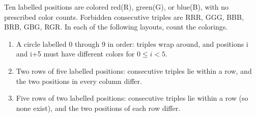 Ten labelled positions are colored red(R), green(G), or blue(B), with no prescribed color counts. Forbidden consecutive triples are RRR, GGG, BBB, BRB, GBG, RGR. In each of the following layouts, count the colorings.\begin{enumerate}\item A circle labelled 0 through 9 in order: triples wrap around, and positions i and i+5 must have different colors for $0\le i<5$.\item Two rows of five labelled positions: consecutive triples lie within a row, and the two positions in every column differ.\item Five rows of two labelled positions: consecutive triples lie within a row (so none exist), and the two positions of each row differ.\end{enumerate}
